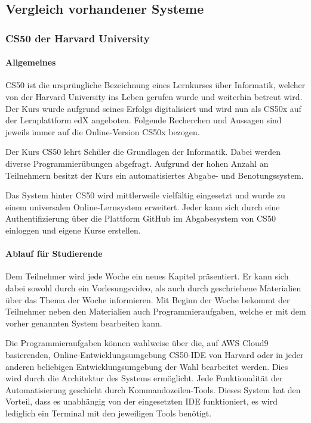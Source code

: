 \subsection{Vergleich vorhandener Systeme}
\subsubsection{CS50 der Harvard University}
\paragraph{Allgemeines}
CS50 ist die ursprüngliche Bezeichnung eines Lernkurses über Informatik,
welcher von der Harvard University ins Leben gerufen wurde und weiterhin
betreut wird. Der Kurs wurde aufgrund seines Erfolgs digitalisiert und wird nun
als CS50x auf der Lernplattform edX angeboten. Folgende Recherchen und Aussagen
sind jeweils immer auf die Online-Version CS50x bezogen.

Der Kurs CS50 lehrt Schüler die Grundlagen der
Informatik. Dabei werden diverse Programmierübungen abgefragt. Aufgrund der
hohen Anzahl an Teilnehmern besitzt der Kurs ein automatisiertes Abgabe- und Benotungssystem.

Das System hinter CS50 wird mittlerweile vielfältig eingesetzt und wurde zu
einem universalen Online-Lernsystem erweitert. Jeder kann sich durch eine
Authentifizierung über die Plattform GitHub im Abgabesystem von CS50 einloggen
und eigene Kurse erstellen. \parencite{cs50}

\paragraph{Ablauf für Studierende}
Dem Teilnehmer wird jede Woche ein neues Kapitel präsentiert. Er kann sich dabei
sowohl durch ein Vorlesungsvideo, als auch durch geschriebene Materialien über
das Thema der Woche informieren. Mit Beginn der Woche bekommt der Teilnehmer
neben den Materialien auch Programmieraufgaben, welche er mit dem vorher
genannten System bearbeiten kann. \parencite{cs50-edx}

Die Programmieraufgaben können wahlweise über die, auf AWS Cloud9 basierenden,
Online-Entwicklungsumgebung \glqq CS50-IDE\grqq{} von Harvard oder in jeder
anderen beliebigen Entwicklungsumgebung der Wahl bearbeitet werden. Dies
wird durch die Architektur des Systems ermöglicht. Jede Funktionalität der
Automatisierung geschieht durch Kommandozeilen-Tools. Dieses System hat den
Vorteil, dass es unabhängig von der eingesetzten IDE funktioniert, es wird
lediglich ein Terminal mit den jeweiligen Tools benötigt. \parencite{cs50-ide}


